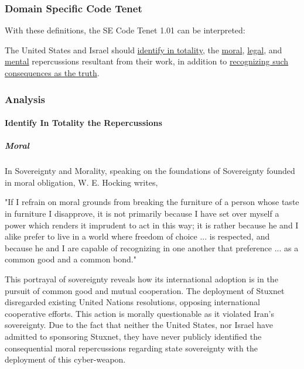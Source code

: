 \documentclass[12pt]{article}
\begin{document}
\begin{multicols}{2}
\subsubsection{Domain Specific Code Tenet}

With these definitions, the SE Code Tenet 1.01 can be interpreted:
\begin{framed}
The United States and Israel should \ul{identify in totality}, the \ul{moral}, \ul{legal}, and \ul{mental} repercussions resultant from their work, in addition to \ul{recognizing such consequences as the truth}.
\end{framed}

\subsubsection{Analysis}

\paragraph{Identify In Totality the Repercussions}

\subparagraph{Moral}

In Sovereignty and Morality, speaking on the foundations of Sovereignty founded in moral obligation, W. E. Hocking writes,

\begin{displayquote}
"If I refrain on moral grounds from breaking the furniture of a person whose taste in furniture I disapprove, it is not primarily because I have set over myself a power which renders it imprudent to act in this way; it is rather because he and I alike prefer to live in a world where freedom of choice ... is respected, and because he and I are capable of recognizing in one another that preference ... as a common good and a common bond."\cite{soverigntyAndMoralObligation}
\end{displayquote}

This portrayal of sovereignty reveals how its international adoption is in the pursuit of common good and mutual cooperation. The deployment of Stuxnet disregarded existing United Nations resolutions, opposing international cooperative efforts.\cite{resolution1747} This action is morally questionable as it violated Iran's sovereignty. Due to the fact that neither the United States, nor Israel have admitted to sponsoring Stuxnet, they have never publicly identified the consequential moral repercussions regarding state sovereignty with the deployment of this cyber-weapon.


\end{multicols}
\end{document}
